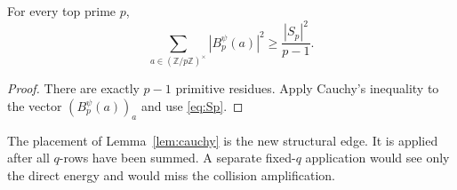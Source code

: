 \begin{lemma}\label{lem:cauchy}
For every top prime $p$,
\begin{equation}\label{eq:cauchy}
 \sum_{a\in(\mathbb Z/p\mathbb Z)^\times}|B_p^\psi(a)|^2
 \geq\frac{|S_p|^2}{p-1}.
\end{equation}
\end{lemma}

\begin{proof}
There are exactly $p-1$ primitive residues.  Apply Cauchy's inequality to the
vector $(B_p^\psi(a))_a$ and use \eqref{eq:Sp}.
\end{proof}

The placement of Lemma~\ref{lem:cauchy} is the new structural edge.  It is
applied after all $q$-rows have been summed.  A separate fixed-$q$ application
would see only the direct energy and would miss the collision amplification.
